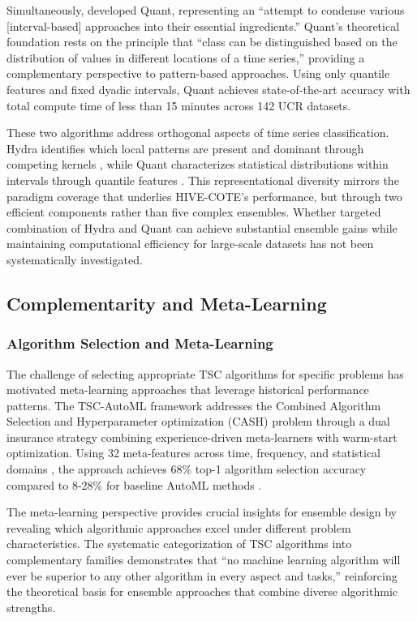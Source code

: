 \documentclass[pdflatex,sn-basic]{sn-jnl}           %
\theoremstyle{thmstyleone}%
\theoremstyle{thmstyletwo}%
\theoremstyle{thmstylethree}%
\begin{document}
Simultaneously, \citet[p.~2377]{quant} developed Quant, representing an ``attempt to condense various [interval-based] approaches into their essential ingredients.'' Quant's theoretical foundation rests on the principle that ``class can be distinguished based on the distribution of values in different locations of a time series,'' providing a complementary perspective to pattern-based approaches. Using only quantile features and fixed dyadic intervals, Quant achieves state-of-the-art accuracy with total compute time of less than 15 minutes across 142 UCR datasets.

These two algorithms address orthogonal aspects of time series classification. Hydra identifies which local patterns are present and dominant through competing kernels \citep[p.~1780]{hydra}, while Quant characterizes statistical distributions within intervals through quantile features \citep[p.~2377]{quant}. This representational diversity mirrors the paradigm coverage that underlies HIVE-COTE's performance, but through two efficient components rather than five complex ensembles. Whether targeted combination of Hydra and Quant can achieve substantial ensemble gains while maintaining computational efficiency for large-scale datasets has not been systematically investigated.

\subsection{Complementarity and Meta-Learning}

\subsubsection{Algorithm Selection and Meta-Learning}

The challenge of selecting appropriate TSC algorithms for specific problems has motivated meta-learning approaches that leverage historical performance patterns. The TSC-AutoML framework \citep{tsc-automl} addresses the Combined Algorithm Selection and Hyperparameter optimization (CASH) problem through a dual insurance strategy combining experience-driven meta-learners with warm-start optimization. Using 32 meta-features across time, frequency, and statistical domains \citep[Table~I, p.~8]{tsc-automl}, the approach achieves 68\% top-1 algorithm selection accuracy compared to 8-28\% for baseline AutoML methods \citep[Table~IV, p.~10]{tsc-automl}.

The meta-learning perspective provides crucial insights for ensemble design by revealing which algorithmic approaches excel under different problem characteristics. The systematic categorization of TSC algorithms into complementary families \citep[Table~II, p.~9]{tsc-automl} demonstrates that ``no machine learning algorithm will ever be superior to any other algorithm in every aspect and tasks,'' reinforcing the theoretical basis for ensemble approaches that combine diverse algorithmic strengths.
\end{document}

